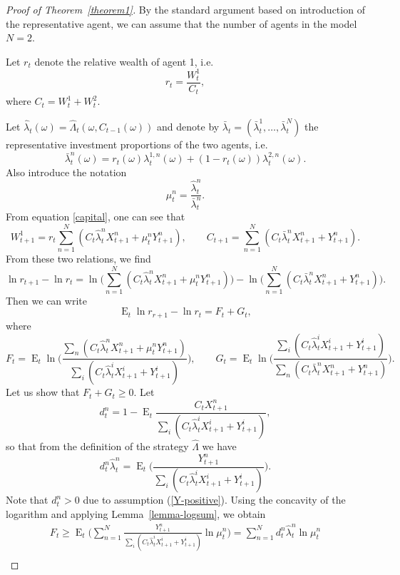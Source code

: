 \documentclass[a4paper,11pt,english]{article}
\theoremstyle{definition}
\DeclareMathOperator{\E}{E}
\renewcommand{\hat}{\widehat}
\begin{document}
\begin{proof}[Proof of Theorem~\ref{theorem1}]
By the standard argument based on introduction of the representative agent, we can
assume that the number of agents in the model $N=2$.

Let $r_t$ denote the relative wealth of agent 1, i.e.\
\[
r_t = \frac{W_t^1}{C_t},
\]
where $C_t = W_t^1 + W_t^2$. 

Let $\hat\lambda_t(\omega) = \hat\Lambda_t(\omega,C_{t-1}(\omega))$ and denote
by $\bar \lambda_t = (\bar\lambda_t^1,\ldots,\bar\lambda_t^N)$ the representative investment proportions of the two
agents, i.e.
\[
\bar \lambda_t^n(\omega) = r_t(\omega) \lambda_t^{1,n}(\omega) + (1-r_t(\omega)) \lambda_t^{2,n}(\omega).
\]
Also introduce the notation
\[
\mu_t^n = \frac{\hat\lambda_t^n}{\bar \lambda_t^n}.
\]
From equation \eqref{capital}, one can see that
\[
W_{t+1}^1 = r_t \sum_{n=1}^N ( C_t\hat\lambda_t^{n} X_{t+1}^n  + \mu_t^n Y_{t+1}^n), \qquad C_{t+1} = \sum_{n=1}^N
(C_t\bar \lambda_t^n X_{t+1}^n + Y_{t+1}^n).
\]
From these two relations, we find
\[
\ln r_{t+1} - \ln r_t = \ln \biggl(\sum_{n=1}^N (C_t\hat\lambda_t^{n} X_{t+1}^n
 + \mu_t^n Y_{t+1}^n)\biggr) - \ln\biggl(\sum_{n=1}^N (C_t \bar\lambda_t^n
 X_{t+1}^n + Y_{t+1}^n)\biggr).
\]
Then we can write
\begin{equation}
\E_t \ln r_{r+1} - \ln r_t = F_t + G_t,\label{loc-submart}
\end{equation}
where
\[
F_t = \E_t \ln \biggl(\frac{\sum_n (C_t \hat\lambda_t^n X_{t+1}^n +
\mu_t^nY_{t+1}^n)}
{\sum_i (C_t\hat\lambda_t^i X_{t+1}^i + Y_{t+1}^i)}\biggr), \qquad
G_t = \E_t \ln\biggl( \frac{\sum_i (C_t\hat\lambda_t^i X_{t+1}^i + Y_{t+1}^i)}{\sum_n (C_t\bar\lambda_t^n X_{t+1}^n + Y_{t+1}^n)}\biggr).
\]
Let us show that $F_t+ G_t \ge 0$. Let
\begin{equation}
d_t^n = 1- \E_t \frac{C_tX_{t+1}^n}{\sum_i (C_t \hat \lambda_t^i X_{t+1}^i +
Y_{t+1}^i)},\label{dt}
\end{equation}
so that from the definition of the strategy $\hat\Lambda$ we have
\[
d_t^n \hat\lambda_t^n =  \E_t \biggl(\frac{Y_{t+1}^n}{\sum_i(C_t\hat\lambda_t^iX_{t+1}^i + Y_{t+1}^i)} \biggr).
\]
Note that $d_t^n>0$ due to assumption (\ref{Y-positive}). Using the
concavity of the logarithm and applying Lemma~\ref{lemma-logsum}, we obtain
\begin{multline}
\label{F}
F_t \ge \E_t\biggl( \sum_{n=1}^N
\frac{Y_{t+1}^n}{\sum_i(C_t\hat\lambda_t^iX_{t+1}^i + Y_{t+1}^i)}\ln
\mu_t^n\biggr) = \sum_{n=1}^N d_t^n \hat\lambda_t^n \ln \mu_t^n \\

\end{multline}
\end{proof}
\end{document}
